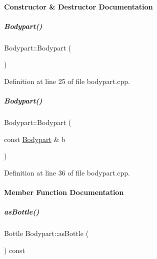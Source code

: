\paragraph{Constructor \& Destructor Documentation}
\mbox{\label{group__icubclient__representations_a3eb671588904ac51120d9db3be131273}} 
\subparagraph{\texorpdfstring{Bodypart()}{Bodypart()}\hspace{0.1cm}{\footnotesize\ttfamily [1/2]}}
{\footnotesize\ttfamily Bodypart\+::\+Bodypart (\begin{DoxyParamCaption}{ }\end{DoxyParamCaption})}



Definition at line 25 of file bodypart.\+cpp.

\mbox{\label{group__icubclient__representations_aaed98e4908214ca9523e46557120743a}} 
\subparagraph{\texorpdfstring{Bodypart()}{Bodypart()}\hspace{0.1cm}{\footnotesize\ttfamily [2/2]}}
{\footnotesize\ttfamily Bodypart\+::\+Bodypart (\begin{DoxyParamCaption}\item[{const \hyperlink{group__icubclient__representations_classicubclient_1_1Bodypart}{Bodypart} \&}]{b }\end{DoxyParamCaption})}



Definition at line 36 of file bodypart.\+cpp.



\paragraph{Member Function Documentation}
\mbox{\label{group__icubclient__representations_acacf4d8971e54092fae9f3278f219562}} 
\subparagraph{\texorpdfstring{as\+Bottle()}{asBottle()}}
{\footnotesize\ttfamily Bottle Bodypart\+::as\+Bottle (\begin{DoxyParamCaption}{ }\end{DoxyParamCaption}) const\hspace{0.3cm}{\ttfamily [virtual]}}



